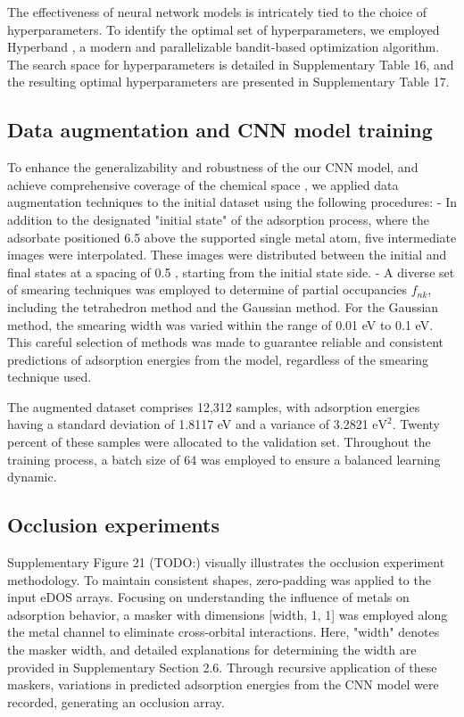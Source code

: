 The effectiveness of neural network models is intricately tied to the choice of hyperparameters.
To identify the optimal set of hyperparameters, we employed Hyperband \cite{li2018hyperband}, a modern and parallelizable bandit-based optimization algorithm.
The search space for hyperparameters is detailed in Supplementary Table 16, and the resulting optimal hyperparameters are presented in Supplementary Table 17.


\subsection{Data augmentation and CNN model training}
To enhance the generalizability and robustness of the our CNN model, and achieve comprehensive coverage of the chemical space \cite{DBLP:journals/corr/abs-2112-12542}, we applied data augmentation techniques to the initial dataset using the following procedures:
	- In addition to the designated "initial state" of the adsorption process, where the adsorbate positioned 6.5 \text{\AA} above the supported single metal atom, five intermediate images were interpolated. These images were distributed between the initial and final states at a spacing of 0.5 \text{\AA}, starting from the initial state side.
	- A diverse set of smearing techniques was employed to determine of partial occupancies $f_{nk}$, including the tetrahedron method \cite{blochl1994improved} and the Gaussian method. For the Gaussian method, the smearing width was varied within the range of 0.01 eV to 0.1 eV. This careful selection of methods was made to guarantee reliable and consistent predictions of adsorption energies from the model, regardless of the smearing technique used.

The augmented dataset comprises 12,312 samples, with adsorption energies having a standard deviation of 1.8117 eV and a variance of 3.2821 $\mathrm{eV}^2$.
Twenty percent of these samples were allocated to the validation set. Throughout the training process, a batch size of 64 was employed to ensure a balanced learning dynamic.


\subsection{Occlusion experiments}
Supplementary Figure 21 (TODO:) visually illustrates the occlusion experiment methodology.
To maintain consistent shapes, zero-padding was applied to the input eDOS arrays.
Focusing on understanding the influence of metals on adsorption behavior, a masker with dimensions [width, 1, 1] was employed along the metal channel to eliminate cross-orbital interactions.
Here, "width" denotes the masker width, and detailed explanations for determining the width are provided in Supplementary Section 2.6.
Through recursive application of these maskers, variations in predicted adsorption energies from the CNN model were recorded, generating an occlusion array.



